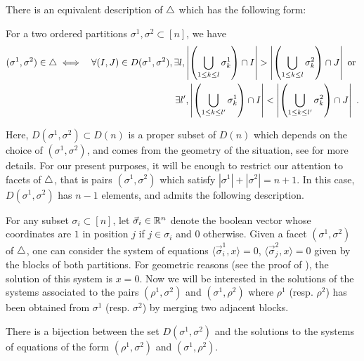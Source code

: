 There is an equivalent description of $\triangle$ which has the following form: 
\begin{proposition}[{\cite{LA21}}]
\label{p:minimal}
For a two ordered partitions $\sigma^1, \sigma^2 \subset [n]$, we have
\begin{eqnarray*}
    (\sigma^1,\sigma^2)\in \triangle 
    & \iff & \forall (I,J) \in D(\sigma^1,\sigma^2), \exists l , 
    \left| \left(\bigcup_{1\leq k \leq l} \sigma^1_{k} \right)\cap I \right|
    >
    \left| \left(\bigcup_{1\leq k \leq l} \sigma^2_{k} \right)\cap J \right| \text{ or } \\
    && \exists l' , 
    \left| \left(\bigcup_{1\leq k \leq l'} \sigma^1_{k} \right)\cap I \right|
    <
    \left| \left(\bigcup_{1\leq k \leq l'} \sigma^2_{k} \right)\cap J \right|  \ . 
\end{eqnarray*}
\end{proposition}
Here, $D(\sigma^1,\sigma^2) \subset D(n)$ is a proper subset of $D(n)$ which depends on the choice of $(\sigma^1,\sigma^2)$, and comes from the geometry of the situation, see \cite[Theorem 1.26]{LA21} for more details.
For our present purposes, it will be enough to restrict our attention to facets of $\triangle$, that is pairs $(\sigma^1,\sigma^2)$ which satisfy $|\sigma^1| + |\sigma^2|=n+1$.
In this case, $D(\sigma^1,\sigma^2)$ has $n-1$ elements, and admits the following description. 

For any subset $\sigma_i \subset [n]$, let $\vec \sigma_i \in \mathbb R^n$ denote the boolean vector whose coordinates are $1$ in position $j$ if $j \in \sigma_i$ and $0$ otherwise. 
Given a facet $(\sigma^1,\sigma^2)$ of $\triangle$, one can consider the system of equations $\langle \vec \sigma^1_i , x \rangle=0$, $\langle \vec \sigma^2_j , x \rangle=0$ given by the blocks of both partitions.
For geometric reasons (see the proof of \cite[Theorem 1.26]{LA21}), the solution of this system is $x=0$. 
Now we will be interested in the solutions of the systems associated to the pairs $(\rho^1,\sigma^2)$ and $(\sigma^1,\rho^2)$ where $\rho^1$ (resp. $\rho^2$) has been obtained from $\sigma^1$ (resp. $\sigma^2$) by merging two adjacent blocks.

\begin{proposition}
\label{p:minimal-IJ-pairs}
    There is a bijection between the set $D(\sigma^1,\sigma^2)$ and the solutions to the systems of equations of the form $(\rho^1,\sigma^2)$ and $(\sigma^1,\rho^2)$. 
\end{proposition}

